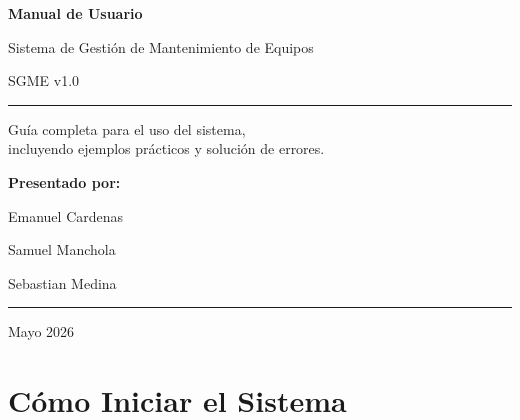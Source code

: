 \documentclass[12pt, a4paper]{article}
\begin{document}
\begin{titlepage}
    \centering
    \vspace*{2cm}

    {\Huge\bfseries\textcolor{primary}{Manual de Usuario}\par}
    \vspace{0.5cm}
    {\Large\textcolor{secondary}{Sistema de Gesti\'on de Mantenimiento de Equipos}\par}
    \vspace{0.3cm}
    {\large SGME v1.0\par}

    \vspace{1.5cm}

    \rule{12cm}{2pt}

    \vspace{1.5cm}

    {\large Gu\'ia completa para el uso del sistema,\\
    incluyendo ejemplos pr\'acticos y soluci\'on de errores.\par}

    \vspace{2cm}

    {\large\textbf{Presentado por:}\par}
    \vspace{0.4cm}
    {\Large Emanuel Cardenas\par}
    \vspace{0.2cm}
    {\Large Samuel Manchola\par}
    \vspace{0.2cm}
    {\Large Sebastian Medina\par}

    \vfill

    \rule{12cm}{1pt}
    \vspace{0.5cm}
    {\large Mayo 2026\par}
\end{titlepage}

\tableofcontents
\newpage

\section{C\'omo Iniciar el Sistema}
\end{document}
